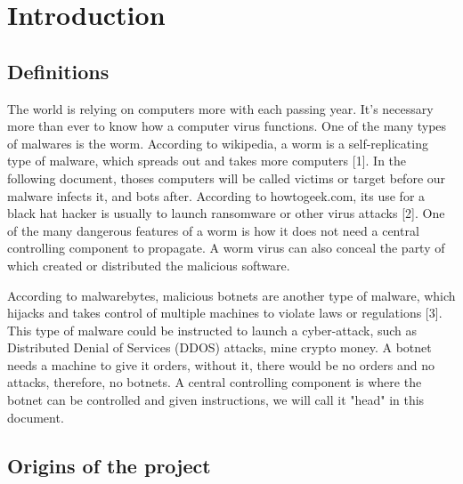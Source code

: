 \documentclass[../main.tex]{subfiles}
\begin{document}
    \newpage

	\chapter{Introduction}

    \section{Definitions}

    The world is relying on computers more with each passing year.
    It's necessary more than ever to know how a computer virus functions. 
    One of the many types of malwares is the worm.
    According to wikipedia, a worm is a self-replicating type of malware, which spreads out and takes more computers [1].
    In the following document, thoses computers will be called victims or target before our malware infects it, and bots after. 
    According to howtogeek.com, its use for a black hat hacker is usually to launch ransomware or other virus attacks [2]. 
    One of the many dangerous features of a worm is how it does not need a central controlling component to propagate. 
    A worm virus can also conceal the party of which created or distributed the malicious software. 

    According to malwarebytes, malicious botnets are another type of malware, which hijacks and takes control of multiple machines to violate laws or regulations [3]. 
    This type of malware could be instructed to launch a cyber-attack, such as Distributed Denial of Services (DDOS) attacks, mine crypto money. 
    A botnet needs a machine to give it orders, without it, there would be no orders and no attacks, therefore, no botnets.
    A central controlling component is where the botnet can be controlled and given instructions, we will call it "head" in this document. 

	\vspace{10pt}
    
    \section{Origins of the project}
\end{document}
